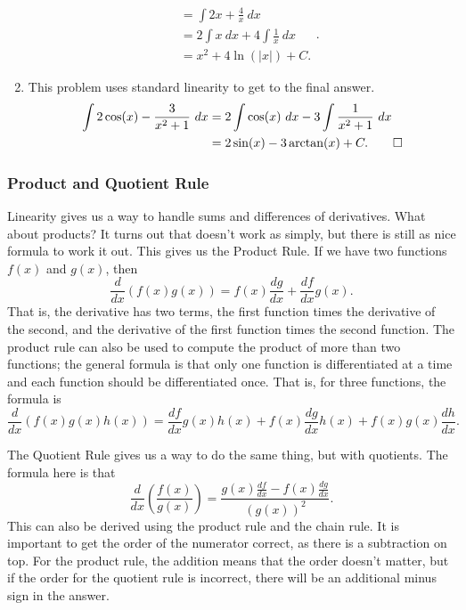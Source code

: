 \documentclass{ximera}
\begin{document}
\begin{exampleSol}
\begin{enumerate}
\[\begin{split}
                    &= \int 2x + \frac{4}{x}\ dx \\
                    &= 2\int x\ dx + 4\int \frac{1}{x}\ dx \\
                    &= x^2 + 4\ln(|x|) + C.
                \end{split}. 
            \]
        \item This problem uses standard linearity to get to the final answer.
            \[ 
                \begin{split}
                    \int 2\cos(x) - \frac{3}{x^2 + 1}\ dx &= 2 \int \cos(x)\ dx - 3 \int \frac{1}{x^2 + 1}\ dx \\
                    &= 2 \sin(x) - 3\arctan(x) + C. \qedhere
                \end{split} 
            \]
    \end{enumerate}
\end{exampleSol}

\subsubsection{Product and Quotient Rule}

Linearity gives us a way to handle sums and differences of derivatives. What about products? It turns out that doesn't work as simply, but there is still as nice formula to work it out. This gives us the Product Rule. If we have two functions $f(x)$ and $g(x)$, then 
\[ 
    \frac{d}{dx}\left( f(x)g(x) \right) = f(x)\frac{dg}{dx} + \frac{df}{dx}g(x). 
\] 
That is, the derivative has two terms, the first function times the derivative of the second, and the derivative of the first function times the second function. The product rule can also be used to compute the product of more than two functions; the general formula is that only one function is differentiated at a time and each function should be differentiated once. That is, for three functions, the formula is
\[ 
    \frac{d}{dx}\left( f(x)g(x)h(x)\right) = \frac{df}{dx}g(x)h(x) + f(x)\frac{dg}{dx}h(x) + f(x)g(x)\frac{dh}{dx}. 
\]

The Quotient Rule gives us a way to do the same thing, but with quotients. The formula here is that
\[ 
    \frac{d}{dx}\left(\frac{f(x)}{g(x)}\right) = \frac{g(x) \frac{df}{dx} - f(x)\frac{dg}{dx}}{(g(x))^2}. 
\] 
This can also be derived using the product rule and the chain rule. It is important to get the order of the numerator correct, as there is a subtraction on top. For the product rule, the addition means that the order doesn't matter, but if the order for the quotient rule is incorrect, there will be an additional minus sign in the answer.
\end{document}
